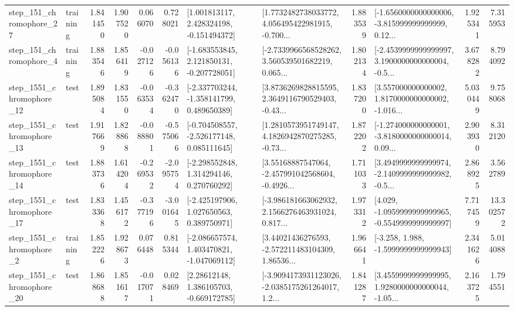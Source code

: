 \begin{tabular}{llrrrrllrlrr}
  step\_151\_chromophore\_27 &  training &      1.841450 &    1.907520 &      0.066070 &  0.728021 &    [1.001813117, 2.428324198, -0.151494372] &  [1.7732482738033772, 4.056495422981915, -0.700... &       1.883539 &  [-1.6560000000000006, -3.815999999999999, 0.12... &            1.925341 &          7.315953 \\
   step\_151\_chromophore\_4 &  training &      1.883546 &    1.856419 &     -0.027126 & -0.056136 &   [-1.683553845, 2.121850131, -0.207728051] &  [-2.7339966568528262, 3.560539501682219, 0.065... &       1.802134 &  [-2.4539999999999997, 3.1900000000000004, -0.5... &            3.678282 &          8.794092 \\
 step\_1551\_chromophore\_12 &      test &      1.895084 &    1.831550 &     -0.063534 & -0.362470 &   [-2.337703244, -1.358141799, 0.489650389] &  [3.8736269828815595, 2.3649116790529403, -0.43... &       1.837200 &  [3.557000000000002, 1.8170000000000002, -1.016... &            5.030449 &          9.758068 \\
 step\_1551\_chromophore\_13 &      test &      1.917669 &    1.828868 &     -0.088801 & -0.575066 &   [-0.704508557, -2.526177148, 0.085111645] &  [1.2810573951749147, 4.1826942870275285, -0.73... &       1.872202 &  [-1.274000000000001, -3.8180000000000014, 0.09... &            2.903930 &          8.312120 \\
 step\_1551\_chromophore\_14 &      test &      1.883736 &    1.614204 &     -0.269532 & -2.095754 &    [-2.298552848, 1.314294146, 0.270760292] &  [3.55168887547064, -2.457991042568604, -0.4926... &       1.711033 &  [3.4949999999999974, -2.1409999999999982, -0.5... &            2.868925 &          3.562789 \\
 step\_1551\_chromophore\_17 &      test &      1.833368 &    1.456172 &     -0.377196 & -3.001645 &    [-2.425197906, 1.027650563, 0.389750971] &  [-3.986181663062932, 2.1566276463931024, 0.817... &       1.973312 &  [4.029, -1.0959999999999965, -0.5549999999999997] &            7.717459 &         13.302572 \\
  step\_1551\_chromophore\_2 &  training &      1.852226 &    1.928673 &      0.076448 &  0.815344 &   [-2.086657574, 1.403470821, -1.047069112] &  [3.44021436276593, -2.572211483104309, 1.86536... &       1.966641 &               [-3.258, 1.988, -1.5999999999999943] &            2.341626 &          5.014088 \\
 step\_1551\_chromophore\_20 &      test &      1.868688 &    1.851617 &     -0.017071 &  0.028469 &     [2.28612148, 1.386105703, -0.669172785] &  [-3.9094173931123026, -2.0385175261264017, 1.2... &       1.841287 &  [3.4559999999999995, 1.9280000000000044, -1.05... &            2.163725 &          1.794551 \\

\end{tabular}
